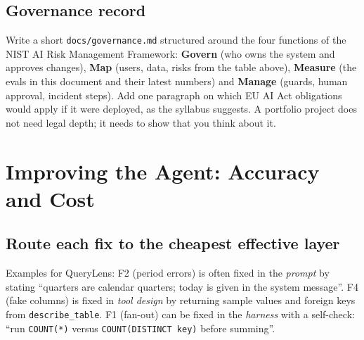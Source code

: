 \documentclass[11pt,a4paper]{article}
\newcommand{\code}[1]{\texttt{\small #1}}
\begin{document}
\subsection{Governance record}

Write a short \code{docs/governance.md} structured around the four functions of the NIST AI Risk
Management Framework: \textbf{Govern} (who owns the system and approves changes), \textbf{Map}
(users, data, risks from the table above), \textbf{Measure} (the evals in this document and their
latest numbers) and \textbf{Manage} (guards, human approval, incident steps). Add one paragraph on
which EU AI Act obligations would apply if it were deployed, as the syllabus suggests. A
portfolio project does not need legal depth; it needs to show that you think about it.

\section{Improving the Agent: Accuracy and Cost}

\subsection{Route each fix to the cheapest effective layer}

\begin{center}
\end{center}

Examples for QueryLens: F2 (period errors) is often fixed in the \emph{prompt} by stating
``quarters are calendar quarters; today is given in the system message''. F4 (fake columns) is
fixed in \emph{tool design} by returning sample values and foreign keys from
\code{describe\_table}. F1 (fan-out) can be fixed in the \emph{harness} with a self-check: ``run
\code{COUNT(*)} versus \code{COUNT(DISTINCT key)} before summing''.
\end{document}
